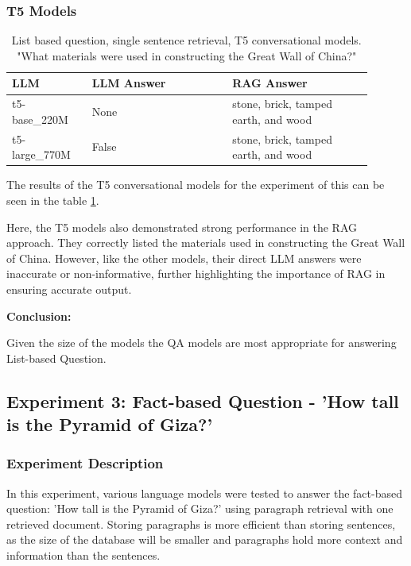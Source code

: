 \documentclass{wseas}
\begin{document}
\subsubsection{T5 Models}

\begin{table}[htbp]
  \centering
  \label{tab:experiment_Q_listBased_R_1Sentence_Q_listBased_M_T5Models_table} 
  \caption{List based question, single sentence retrieval, T5 conversational models. "What materials were used in constructing the Great Wall of China?"} %
  \begin{tabular}{|p{0.20\linewidth}|p{0.35\linewidth}|p{0.35\linewidth}|}
    \hline
    \textbf{LLM} & \textbf{LLM Answer} & \textbf{RAG Answer} \\ \hline
    t5-base\_220M & None & stone, brick, tamped earth, and wood \\ \hline
    t5-large\_770M & False & stone, brick, tamped earth, and wood \\ \hline
  \end{tabular}
\end{table}

The results of the T5 conversational models for the experiment of this
can be seen in the table \ref{tab:experiment_Q_listBased_R_1Sentence_Q_listBased_M_T5Models_table}.

Here, the T5 models also demonstrated strong performance in the RAG approach.
They correctly listed the materials used in constructing the Great Wall of
China. However, like the other models, their direct LLM answers were
inaccurate or non-informative, further highlighting the importance of
RAG in ensuring accurate output.

\textbf{Conclusion:}

Given the size of the models the QA models are most appropriate for
answering List-based Question.


\subsection{Experiment 3: Fact-based Question - 'How tall is the Pyramid of Giza?'}

\subsubsection{Experiment Description}

In this experiment, various language models were tested to answer the
fact-based question: 'How tall is the Pyramid of Giza?' using
paragraph retrieval with one retrieved document. Storing paragraphs is
more efficient than storing sentences, as the size of the database will
be smaller and paragraphs hold more context and information than the
sentences. 
\end{document}
